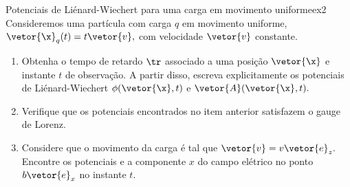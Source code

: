 \begin{exercício}{Potenciais de Liénard-Wiechert para uma carga em movimento uniforme}{ex2}
   Consideremos uma partícula com carga \(q\) em movimento uniforme, \(\vetor{\x}_q(t) = t\vetor{v},\) com velocidade \(\vetor{v}\) constante.
   \begin{enumerate}[label=(\alph*)]
      \item Obtenha o tempo de retardo \(\tr\) associado a uma posição \(\vetor{\x}\) e instante \(t\) de observação. A partir disso, escreva explicitamente os potenciais de Liénard-Wiechert \(\phi(\vetor{\x}, t)\) e \(\vetor{A}(\vetor{\x}, t).\)
      \item Verifique que os potenciais encontrados no item anterior satisfazem o gauge de Lorenz.
      \item Considere que o movimento da carga é tal que \(\vetor{v} = v \vetor{e}_z.\) Encontre os potenciais e a componente \(x\) do campo elétrico no ponto \(b\vetor{e}_x\) no instante \(t\).
   \end{enumerate}
\end{exercício}
